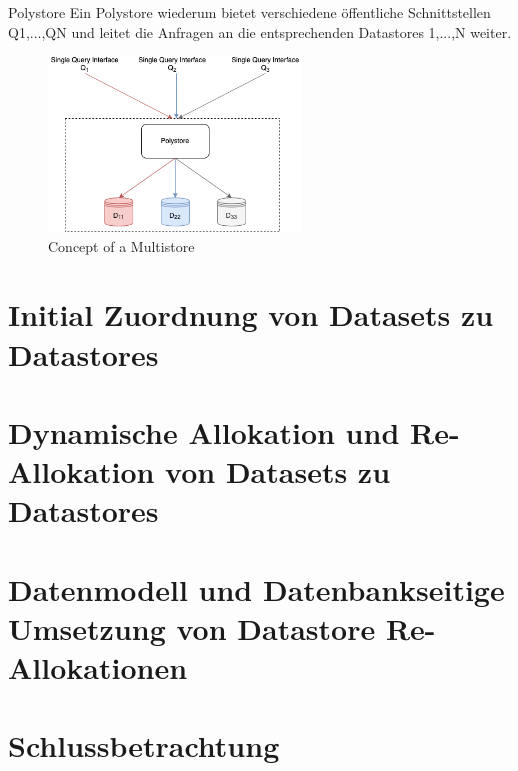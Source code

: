 Polystore
Ein Polystore wiederum bietet verschiedene öffentliche Schnittstellen Q1,...,QN und leitet die Anfragen an die entsprechenden 
Datastores 1,...,N weiter.

\begin{figure}[htbp]
    \centering
    \includegraphics[width=0.60\textwidth]{gfx/examples/master_thesis-polystore.png}
    \caption{Concept of a Multistore}
    \label{fig:multistore}
\end{figure} 


\chapter{Initial Zuordnung von Datasets zu Datastores}



\chapter{Dynamische Allokation und Re-Allokation von Datasets zu Datastores}



\chapter{Datenmodell und Datenbankseitige Umsetzung von Datastore Re-Allokationen}


\chapter{Schlussbetrachtung}